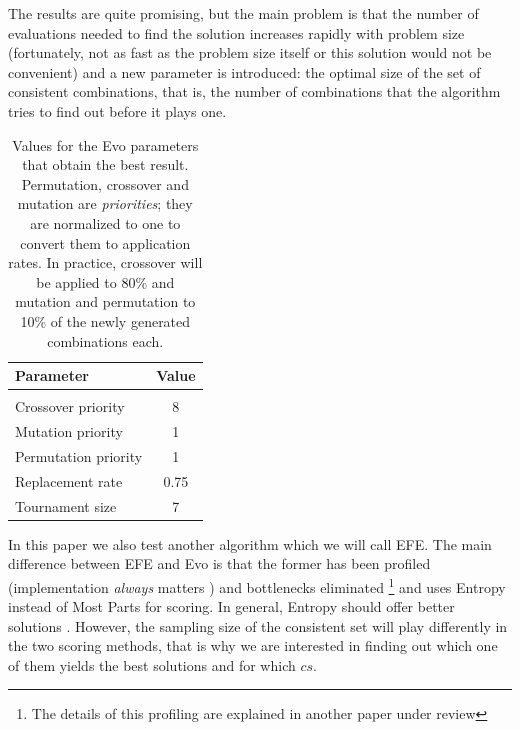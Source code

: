 \documentclass[conference]{IEEEtran}
\begin{document}
The results are quite promising,
 but the main problem is that the number of evaluations needed to find the solution increases rapidly with problem size (fortunately, not as fast as the problem size itself or this solution would not be convenient) and a new parameter is introduced: the optimal size of the set of consistent combinations, that is, the number of combinations that the algorithm tries to find out before it plays one.  

\begin{table}[t!]
\centering 
\caption{Values for the Evo parameters that obtain the best
  result. Permutation, crossover and mutation are {\em priorities};
  they are normalized to one to convert them to application rates. In
  practice, crossover will be applied to 80\% and mutation and
  permutation to 10\% of the newly generated combinations each. \label{tab:params}}
\begin{tabular}{lc}
\hline
Parameter & Value \\
\hline \\
Crossover priority & 8 \\
Mutation  priority & 1 \\
Permutation priority  & 1 \\
Replacement rate  & 0.75 \\ 
Tournament size & 7 \\
\hline
\end{tabular}
\end{table}

In this paper we also test another algorithm which we will call
EFE. 
The main difference between EFE and Evo is that the former has
been profiled (implementation {\em always} matters
\cite{DBLP:conf/iwann/MereloRACML11}) and bottlenecks eliminated
\footnote{The details of this profiling are explained in another paper
  under review}
and uses Entropy instead of Most Parts for scoring. In general,
Entropy should offer better solutions \cite{mm:evostar13}. However,
the sampling size of 
the consistent set will play differently in the two scoring methods,
that is why we are interested in finding out which one of them yields
the best solutions and for which $cs$. 
\end{document}
